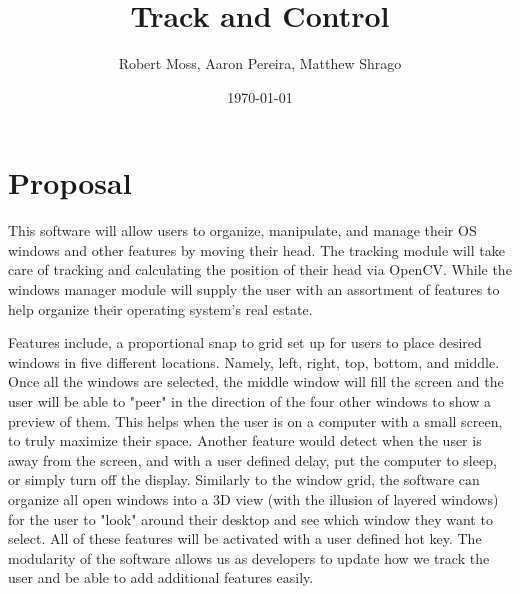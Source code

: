 \documentclass[12pt]{article}
\title{Track and Control}
\author{Robert Moss, Aaron Pereira, Matthew Shrago}
\date{\today}
\begin{document}
\maketitle

\section{Proposal}

This software will allow users to organize, manipulate, and manage their OS windows and other features by moving their head. The tracking module will take care of tracking and calculating the position of their head via OpenCV. While the windows manager module will supply the user with an assortment of features to help organize their operating system's real estate. 

Features include, a proportional snap to grid set up for users to place desired windows in five different locations. Namely, left, right, top, bottom, and middle. Once all the windows are selected, the middle window will fill the screen and the user will be able to "peer" in the direction of the four other windows to show a preview of them. This helps when the user is on a computer with a small screen, to truly maximize their space. Another feature would detect when the user is away from the screen, and with a user defined delay, put the computer to sleep, or simply turn off the display. Similarly to the window grid, the software can organize all open windows into a 3D view (with the illusion of layered windows) for the user to "look" around their desktop and see which window they want to select. All of these features will be activated with a user defined hot key. The modularity of the software allows us as developers to update how we track the user and be able to add additional features easily.
\end{document}

